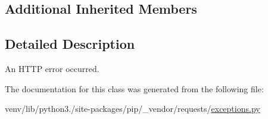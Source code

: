 \subsection*{Additional Inherited Members}


\subsection{Detailed Description}
\begin{DoxyVerb}An HTTP error occurred.\end{DoxyVerb}
 

The documentation for this class was generated from the following file\+:\begin{DoxyCompactItemize}
\item 
venv/lib/python3./site-\/packages/pip/\+\_\+vendor/requests/\hyperlink{pip_2__vendor_2requests_2exceptions_8py}{exceptions.\+py}\end{DoxyCompactItemize}
